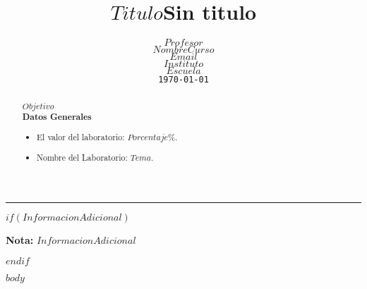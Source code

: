 \documentclass[11pt,a4paper]{scrartcl}			%
\title{$Titulo$}
\title{Sin titulo} %
\author{%
	$Profesor$ \\
	\textit{$NombreCurso$} \\
	\texttt{$Email$}\vspace{40pt} \\
	$Instituto$ \\
	$Escuela$ \\
	\texttt{\monthyeardate\today}
	}
\makeatletter
\def\printtitle{%
    {\centering \huge \normalfont \textbf{\@title}\par}}		%
\def\printauthor{%
    {\large \@author}}				%
\makeatother
\begin{document}
\begin{minipage}{0.35\linewidth}
	\begin{flushright}
		\printauthor
	\end{flushright}
\end{minipage} \hspace{0pt}
%
\begin{minipage}{0.02\linewidth}
	\rule{3pt}{175pt}
\end{minipage} \hspace{0pt}
%
\begin{minipage}{0.63\linewidth}
\printtitle 
\vspace{5pt}
	\begin{abstract} 
$Objetivo$ \\

\textbf{Datos Generales}
\begin{itemize}
\item El valor del laboratorio: $Porcentaje$\%.
\item Nombre del Laboratorio:  $Tema$. 
\end{itemize}
	\end{abstract}
\end{minipage}
\vspace{20pt}		%


$if(InformacionAdicional)$

\textbf{Nota:}
$InformacionAdicional$

$endif$

\spanishsignitems


$body$
\end{document}

